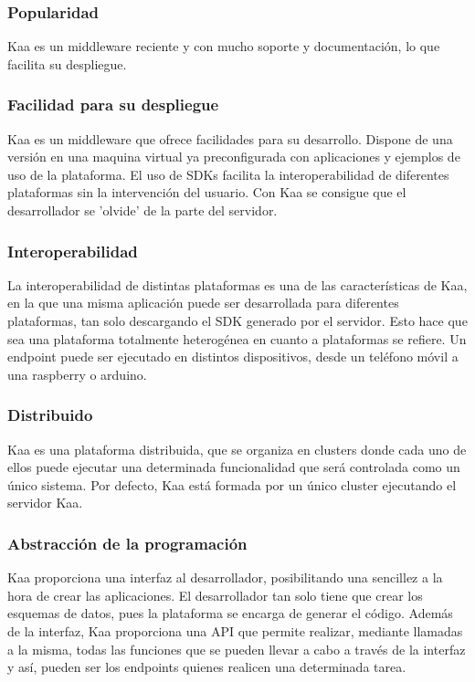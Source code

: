 \documentclass[12pt, twoside]{book}
\begin{document}
\subsubsection*{Popularidad}
Kaa es un middleware reciente y con mucho soporte y documentación, lo que facilita su despliegue.
\subsubsection*{Facilidad para su despliegue} 
Kaa es un middleware que ofrece facilidades para su desarrollo. Dispone de una versión en una maquina virtual ya preconfigurada con aplicaciones y ejemplos de uso de la plataforma. El uso de SDKs facilita la interoperabilidad de diferentes plataformas sin la intervención del usuario. Con Kaa se consigue que el desarrollador se 'olvide' de la parte del servidor. 

\subsubsection*{Interoperabilidad}
La interoperabilidad de distintas plataformas es una de las características de Kaa, en la que una misma aplicación puede ser desarrollada para diferentes plataformas, tan solo descargando el SDK generado por el servidor. Esto hace que sea una plataforma totalmente heterogénea en cuanto a plataformas se refiere. Un endpoint puede ser ejecutado en distintos dispositivos, desde un teléfono móvil a una raspberry o arduino.


\subsubsection*{Distribuido}
Kaa es una plataforma distribuida, que se organiza en clusters donde cada uno de ellos puede ejecutar una determinada funcionalidad que será controlada como un único sistema. Por defecto, Kaa está formada por un único cluster ejecutando el servidor Kaa. 




\subsubsection*{Abstracción de la programación}
Kaa proporciona una interfaz al desarrollador, posibilitando una sencillez a la hora de crear las aplicaciones. El desarrollador tan solo tiene que crear los esquemas de datos, pues la plataforma se encarga de generar el código. Además de la interfaz, Kaa proporciona una API que permite realizar, mediante llamadas a la misma, todas las funciones que se pueden llevar a cabo a través de la interfaz y así, pueden ser los endpoints quienes realicen una determinada tarea.
\end{document}
